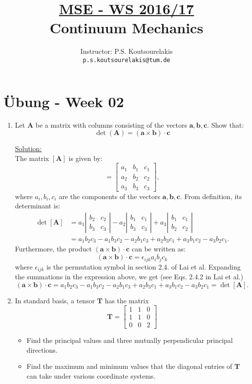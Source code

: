 \documentclass{article}
\title{\underline{MSE - WS 2016/17}\\
Continuum Mechanics}
\author{
Instructor: P.S. Koutsourelakis  \\
\texttt{p.s.koutsourelakis@tum.de} \\
}
\newcommand{\ee}{\end{equation}}
\newcommand{\be}{\begin{equation}}
\newcommand{\bi}{\begin{itemize}}
\newcommand{\ei}{\end{itemize}}
\newcommand{\bs}{\boldsymbol}
\begin{document}
\makeanontitle

%

\section*{\"Ubung - Week 02}


\begin{enumerate}
\item Let $\bs{A}$ be a matrix with columns consisting of the vectors $\bs a,\bs b, \bs c$. Show that:
\be
\det(\bs{A})=(\bs{a} \times \bs{b}) \cdot \bs{c}
\ee

\underline{Solution:} \\
The matrix $[\bs{A}]$ is given by:
\be
[\bs{A}]=\left[ \begin{array}{lll} a_1 & b_1 & c_1 \\ a_2 & b_2 & c_2\\ a_3 & b_3 & c_3 \end{array} \right],
\ee
where $a_i,b_i,c_i$ are the components of the vectors $\bs{a,b,c}$.
From definition, its determinant is:
\be
\begin{array}{ll}
\det [\bs{A}] &=a_1 \left| \begin{array}{ll}  b_2 & c_2 \\  b_3 & c_3 \end{array} \right|-a_2\left| \begin{array}{ll}  b_1 & c_1 \\  b_3 & c_3 \end{array}
\right|+a_3 \left|\begin{array}{ll}  b_1 & c_1 \\  b_2 & c_2 \end{array} \right| \\
&=a_1b_2c_3-a_1b_3c_2-a_2b_1c_3+a_2b_3c_1+a_3b_1c_2-a_3b_2c_1.
\end{array}
\ee
Furthermore, the product $(\bs{a} \times \bs{b}) \cdot \bs{c}$ can be written as:
\be
(\bs{a} \times \bs{b}) \cdot \bs{c}=\epsilon_{ijk}a_ib_jc_k
\ee
where $\epsilon_{ijk}$ is the permutation symbol in section 2.4. of Lai et al. Expanding the summations in the expression above, we get (see Eqs. 2.4.2 in Lai
et al.)
\be
(\bs{a} \times \bs{b}) \cdot \bs{c}=a_1b_2c_3-a_1b_3c_2-a_2b_1c_3+a_2b_3c_1+a_3b_1c_2-a_3b_2c_1=\det [\bs{A}].
\ee
\item In standard basis, a tensor $\bs{T}$ has the matrix
\be
\bs{T}=\left[\begin{array}{lll}
   1&  1 & 0 \\          1 & 1 & 0 \\ 0 & 0 & 2 
             \end{array}
\right]
\ee
\bi
\item Find the principal values and three mutually perpendicular principal directions.
\item Find the maximum and minimum values that the diagonal entries of $\bs{T}$ can take under various coordinate
systems.
\ei


\end{enumerate}
\end{document}
